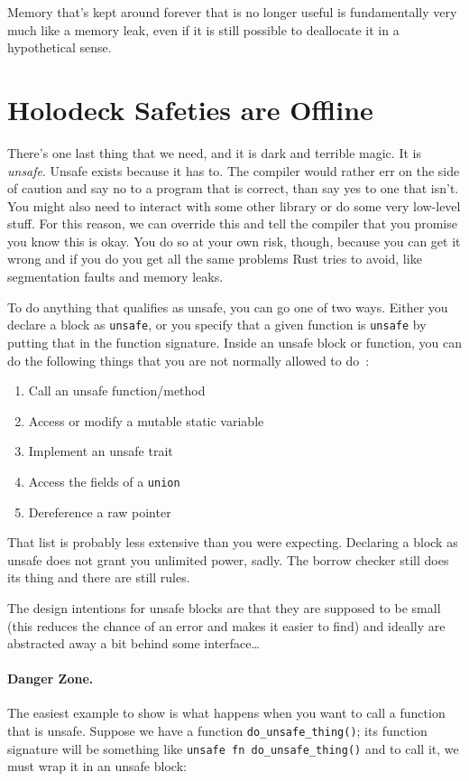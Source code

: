 \documentclass[a4paper]{report}
\begin{document}
Memory that's kept around forever that is no longer useful is fundamentally very much like a memory leak, even if it is still possible to deallocate it in a hypothetical sense.

\section*{Holodeck Safeties are Offline}
There's one last thing that we need, and it is dark and terrible magic. It is \textit{unsafe}. Unsafe exists because it has to. The compiler would rather err on the side of caution and say no to a program that is correct, than say yes to one that isn't. You might also need to interact with some other library or do some very low-level stuff. For this reason, we can override this and tell the compiler that you promise you know this is okay. You do so at your own risk, though, because you can get it wrong and if you do you get all the same problems Rust tries to avoid, like segmentation faults and memory leaks.

To do anything that qualifies as unsafe, you can go one of two ways. Either you declare a block as \texttt{unsafe}, or you specify that a given function is \texttt{unsafe} by putting that in the function signature. Inside an unsafe block or function, you can do the following things that you are not normally allowed to do~\cite{rustdocs}:

\begin{enumerate}
	\item Call an unsafe function/method
	\item Access or modify a mutable static variable
	\item Implement an unsafe trait
	\item Access the fields of a \texttt{union}
	\item Dereference a raw pointer
\end{enumerate}

That list is probably less extensive than you were expecting. Declaring a block as unsafe does not grant you unlimited power, sadly. The borrow checker still does its thing and there are still rules. 

The design intentions for unsafe blocks are that they are supposed to be small (this reduces the chance of an error and makes it easier to find) and ideally are abstracted away a bit behind some interface\ldots

\paragraph{Danger Zone.} The easiest example to show is what happens when you want to call a function that is unsafe. Suppose we have a function \texttt{do\_unsafe\_thing()}; its function signature will be something like \texttt{unsafe fn do\_unsafe\_thing()} and to call it, we must wrap it in an unsafe block:
\end{document}
